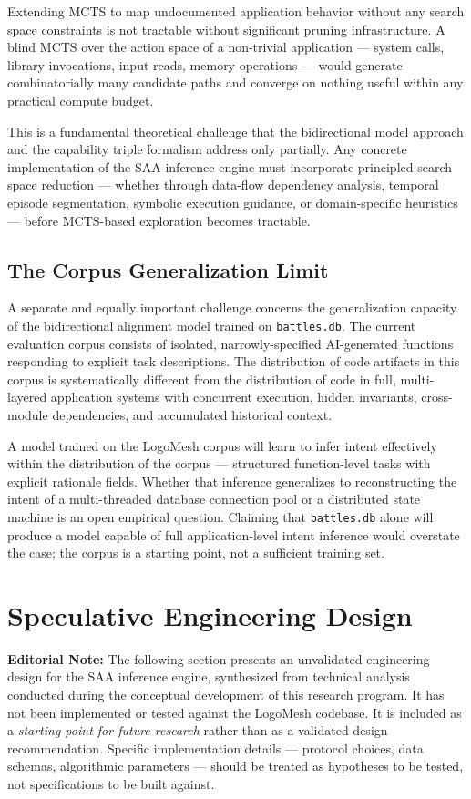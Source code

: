 \documentclass[11pt, a4paper]{article}
\begin{document}
Extending MCTS to map undocumented application behavior without any search space constraints is not tractable without significant pruning infrastructure. A blind MCTS over the action space of a non-trivial application — system calls, library invocations, input reads, memory operations — would generate combinatorially many candidate paths and converge on nothing useful within any practical compute budget.

This is a fundamental theoretical challenge that the bidirectional model approach and the capability triple formalism address only partially. Any concrete implementation of the SAA inference engine must incorporate principled search space reduction — whether through data-flow dependency analysis, temporal episode segmentation, symbolic execution guidance, or domain-specific heuristics — before MCTS-based exploration becomes tractable.

\subsection{The Corpus Generalization Limit}

A separate and equally important challenge concerns the generalization capacity of the bidirectional alignment model trained on \texttt{battles.db}. The current evaluation corpus consists of isolated, narrowly-specified AI-generated functions responding to explicit task descriptions. The distribution of code artifacts in this corpus is systematically different from the distribution of code in full, multi-layered application systems with concurrent execution, hidden invariants, cross-module dependencies, and accumulated historical context.

A model trained on the LogoMesh corpus will learn to infer intent effectively within the distribution of the corpus — structured function-level tasks with explicit rationale fields. Whether that inference generalizes to reconstructing the intent of a multi-threaded database connection pool or a distributed state machine is an open empirical question. Claiming that \texttt{battles.db} alone will produce a model capable of full application-level intent inference would overstate the case; the corpus is a starting point, not a sufficient training set.

\section{Speculative Engineering Design}

\begin{mdframed}[style=speculativebox]
\textbf{Editorial Note:} The following section presents an unvalidated engineering design for the SAA inference engine, synthesized from technical analysis conducted during the conceptual development of this research program. It has not been implemented or tested against the LogoMesh codebase. It is included as a \emph{starting point for future research} rather than as a validated design recommendation. Specific implementation details — protocol choices, data schemas, algorithmic parameters — should be treated as hypotheses to be tested, not specifications to be built against.
\end{mdframed}
\end{document}
